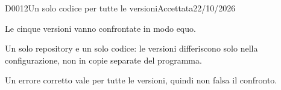 \begin{decisione}{D0012}{Un solo codice per tutte le versioni}{Accettata}{22/10/2026}

\contesto
Le cinque versioni vanno confrontate in modo equo.

\scelta
Un solo repository e un solo codice: le versioni differiscono solo nella configurazione, non in copie separate del programma.

\conseguenze
Un errore corretto vale per tutte le versioni, quindi non falsa il confronto.

\end{decisione}
